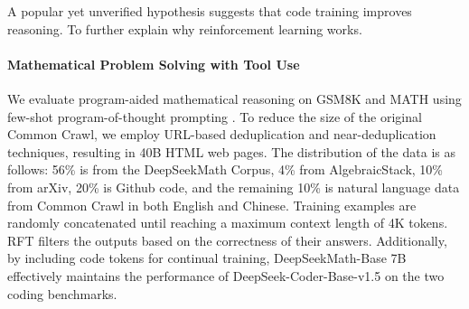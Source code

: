 A popular yet unverified hypothesis suggests that code training improves reasoning. To further explain why reinforcement learning works. \paragraph{Mathematical Problem Solving with Tool Use} We evaluate program-aided mathematical reasoning on GSM8K and MATH using few-shot program-of-thought prompting \citep{pot,pal}. To reduce the size of the original Common Crawl, we employ URL-based deduplication and near-deduplication techniques, resulting in 40B HTML web pages. The distribution of the data  is as follows: 56\% is from the DeepSeekMath Corpus, 4\% from AlgebraicStack, 10\% from arXiv, 20\% is Github code, and the remaining 10\% is natural language data from Common Crawl in both English and Chinese. Training examples are randomly concatenated until reaching a maximum context length of 4K tokens. RFT filters the outputs based on the correctness of their answers. Additionally, by including code tokens for continual training, DeepSeekMath-Base 7B effectively maintains the performance of DeepSeek-Coder-Base-v1.5 on the two coding benchmarks. \begin{itemize}[topsep=0pt]

\end{itemize}
